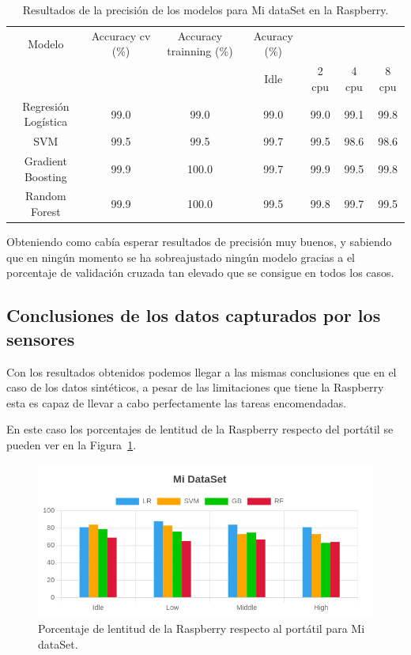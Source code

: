 \documentclass[a4paper, 12pt]{book}
\begin{document}
\begin{table}[]
\begin{adjustbox}{width=\textwidth}
\centering
    \begin{tabular}{c  c  c  c  c  c  c}
    \hline
    Modelo & Accuracy cv (\%) & Accuracy trainning (\%) & Acuracy (\%) & & & \\
    \cline{4-7}
     &  &   &  Idle & 2 cpu & 4 cpu & 8 cpu \\
     \hline
     Regresión Logística & 99.0 & 99.0 & 99.0 & 99.0 & 99.1 & 99.8\\
     SVM & 99.5 & 99.5 & 99.7 & 99.5 & 98.6 & 98.6\\
     Gradient Boosting & 99.9 & 100.0 & 99.7 & 99.9 & 99.5 & 99.8\\
     Random Forest & 99.9 & 100.0 & 99.5 & 99.8 & 99.7 & 99.5\\
    \hline
    \end{tabular}
\end{adjustbox}
\caption{Resultados de la precisión de los modelos para Mi dataSet en la Raspberry.}
\label{tab:acc_senspc}
\end{table}

Obteniendo como cabía esperar resultados de precisión muy buenos, y sabiendo que en ningún momento se ha sobreajustado ningún modelo gracias a el porcentaje de validación cruzada tan elevado que se consigue en todos los casos.

\subsection{Conclusiones de los datos capturados por los sensores}
\label{subsec:conclusiones_sensados}

Con los resultados obtenidos podemos llegar a las mismas conclusiones que en el caso de los datos sintéticos, a pesar de las limitaciones que tiene la Raspberry esta es capaz de llevar a cabo perfectamente las tareas encomendadas.

En este caso los porcentajes de lentitud de la Raspberry respecto del portátil se pueden ver en la Figura~\ref{fig:per_Mi}.

\begin{figure}[]
  \centering
  \includegraphics[width=14cm, keepaspectratio]{img/per_mi.png}
  \caption{Porcentaje de lentitud de la Raspberry respecto al portátil para Mi dataSet.}
  \label{fig:per_Mi}
\end{figure}
\end{document}
